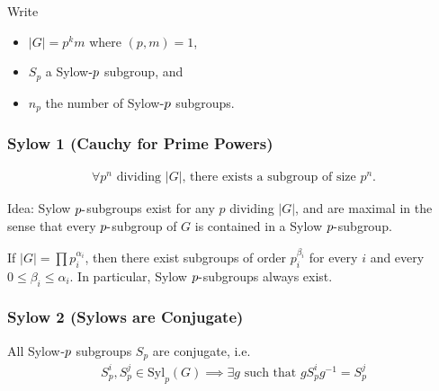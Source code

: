 Write

\begin{itemize}
\tightlist
\item
  \({\left\lvert {G} \right\rvert} = p^k m\) where \((p, m) = 1\),
\item
  \(S_p\) a Sylow\({\hbox{-}}p\) subgroup, and
\item
  \(n_p\) the number of Sylow\({\hbox{-}}p\) subgroups.
\end{itemize}

\hypertarget{sylow-1-cauchy-for-prime-powers}{%
\subsubsection{Sylow 1 (Cauchy for Prime
Powers)}\label{sylow-1-cauchy-for-prime-powers}}

\begin{theorem}[Sylow 1]

\begin{align*}
\forall p^n \text{ dividing } {\left\lvert {G} \right\rvert} \text{, there exists a subgroup of size } p^n
.\end{align*}

\end{theorem}

Idea: Sylow \(p{\hbox{-}}\)subgroups exist for any \(p\) dividing
\({\left\lvert {G} \right\rvert}\), and are maximal in the sense that
every \(p{\hbox{-}}\)subgroup of \(G\) is contained in a Sylow
\(p{\hbox{-}}\)subgroup.

If \({\left\lvert {G} \right\rvert} = \prod p_i^{\alpha_i}\), then there
exist subgroups of order \(p_i^{\beta_i}\) for every \(i\) and every
\(0 \leq \beta_i \leq \alpha_i\). In particular, Sylow
\(p{\hbox{-}}\)subgroups always exist.

\hypertarget{sylow-2-sylows-are-conjugate}{%
\subsubsection{Sylow 2 (Sylows are
Conjugate)}\label{sylow-2-sylows-are-conjugate}}

\begin{theorem}[Sylow 2]

All Sylow\({\hbox{-}}p\) subgroups \(S_p\) are conjugate, i.e.
\begin{align*}
S_p^i, S_p^j \in \mathrm{Syl}_p(G) \implies \exists g \text{ such that } g S_p^i g^{-1}= S_p^j
\end{align*}

\end{theorem}


